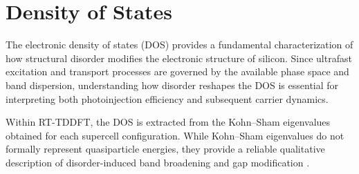 








\section{Density of States}

The electronic density of states (DOS) provides a fundamental characterization of how structural disorder modifies the electronic structure of silicon. Since ultrafast excitation and transport processes are governed by the available phase space and band dispersion, understanding how disorder reshapes the DOS is essential for interpreting both photoinjection efficiency and subsequent carrier dynamics.

Within RT-TDDFT, the DOS is extracted from the Kohn–Sham eigenvalues obtained for each supercell configuration. While Kohn–Sham eigenvalues do not formally represent quasiparticle energies, they provide a reliable qualitative description of disorder-induced band broadening and gap modification \cite{Onida2002ElectronicExcitations}. 



